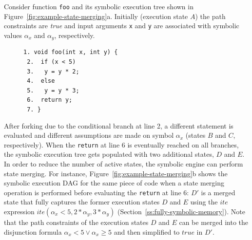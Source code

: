 \begin{shaded} Consider function {\tt foo}  and its symbolic execution tree shown in Figure~\ref{fig:example-state-merging}a. Initially (execution state $A$) the path constraints are {\em true} and input arguments {\tt x} and {\tt y} are associated with symbolic values $\alpha_x$ and $\alpha_y$, respectively.
\begin{figure}
  \vspace{-4.2mm}
  \begin{lstlisting}[basicstyle=\ttfamily\small]
 1. void foo(int x, int y) {
 2.  if (x < 5)
 3.   y = y * 2;
 4.  else
 5.   y = y * 3;
 6.  return y;
 7. }
\end{lstlisting}
\vspace{-5.8mm}
\end{figure}
After forking due to the conditional branch at line 2, a different statement is evaluated and different assumptions are made on symbol $\alpha_x$ (states $B$ and $C$, respectively). When the {\tt return} at line 6 is eventually reached on all branches, the symbolic execution tree gets populated with two additional states, $D$ and $E$. In order to reduce the number of active states, the symbolic engine can perform state merging. For instance, Figure~\ref{fig:example-state-merging}b shows the symbolic execution DAG for the same piece of code when a state merging operation is performed before evaluating the {\tt return} at line 6: $D'$ is a merged state that fully captures the former execution states $D$ and $E$ using the $ite$ expression $ite(\alpha_x<5, 2*\alpha_y, 3*\alpha_y)$ (Section~\ref{ss:fully-symbolic-memory}). 
Note that the path constraints of the execution states $D$ and $E$ can be merged into the disjunction formula $\alpha_x < 5 \vee \alpha_x \geq 5$ and then simplified to $true$ in $D'$.
\end{shaded}

